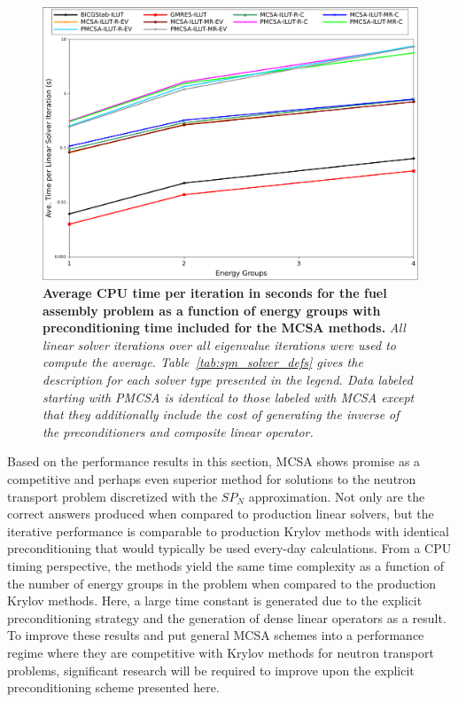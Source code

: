 \begin{figure}[t!]
  \begin{center}
    \includegraphics[width=6in]{chapters/spn_equations/solver_p_time.pdf}
  \end{center}
  \caption{\textbf{Average CPU time per iteration in seconds for the
      fuel assembly problem as a function of energy groups with
      preconditioning time included for the MCSA methods.}
    \textit{All linear solver iterations over all eigenvalue
      iterations were used to compute the
      average. Table~\ref{tab:spn_solver_defs} gives the description
      for each solver type presented in the legend. Data labeled
      starting with PMCSA is identical to those labeled with MCSA
      except that they additionally include the cost of generating the
      inverse of the preconditioners and composite linear operator.}}
  \label{fig:spn_comparison_prec_time}
\end{figure}

Based on the performance results in this section, MCSA shows promise
as a competitive and perhaps even superior method for solutions to the
neutron transport problem discretized with the $SP_N$
approximation. Not only are the correct answers produced when compared
to production linear solvers, but the iterative performance is
comparable to production Krylov methods with identical preconditioning
that would typically be used every-day calculations. From a CPU timing
perspective, the methods yield the same time complexity as a function
of the number of energy groups in the problem when compared to the
production Krylov methods. Here, a large time constant is generated
due to the explicit preconditioning strategy and the generation of
dense linear operators as a result. To improve these results and put
general MCSA schemes into a performance regime where they are
competitive with Krylov methods for neutron transport problems,
significant research will be required to improve upon the explicit
preconditioning scheme presented here.
